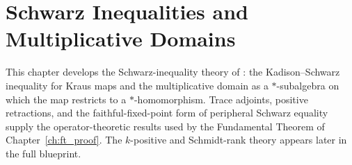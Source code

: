\chapter{Schwarz Inequalities and Multiplicative Domains}\label{ch:schwarz}

This chapter develops the Schwarz-inequality theory of
\cite[Chapter~5]{Wolf2012Quantum}: the Kadison--Schwarz inequality for Kraus
maps and the multiplicative domain as a $*$-subalgebra on which the map
restricts to a $*$-homomorphism. Trace adjoints, positive retractions, and the
faithful-fixed-point form of peripheral Schwarz equality supply the
operator-theoretic results used by the Fundamental Theorem of
Chapter~\ref{ch:ft_proof}. The $k$-positive and Schmidt-rank theory appears
later in the full blueprint.



